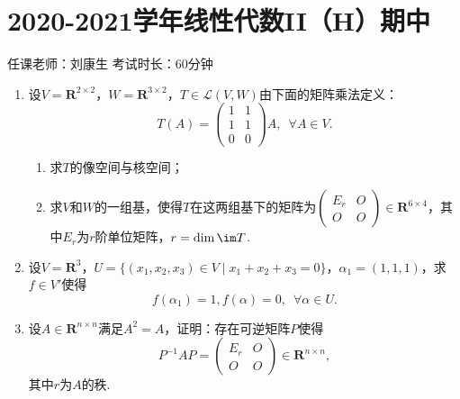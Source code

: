 \section{2020-2021学年线性代数II（H）期中}

\begin{center}
    任课老师：刘康生\hspace{4em} 考试时长：60分钟
\end{center}

\begin{enumerate}
    \item 设$V=\mathbf{R}^{2\times 2}$，$W=\mathbf{R}^{3\times 2}$，$T\in\mathcal{L}(V,W)$由下面的矩阵乘法定义：
	\[T(A)=\begin{pmatrix}
        1 & 1 \\ 1 & 1 \\ 0 & 0
    \end{pmatrix}A,\enspace \forall A\in V.\]
    \begin{enumerate}
        \item 求$T$的像空间与核空间；

        \item 求$V$和$W$的一组基，使得$T$在这两组基下的矩阵为$\begin{pmatrix}
            E_r & O \\ O & O
        \end{pmatrix}\in\mathbf{R}^{6\times 4}$，其中$E_r$为$r$阶单位矩阵，$r=\dim\im T$.
    \end{enumerate}
	\item 设$V=\mathbf{R}^3$，$U=\{(x_1,x_2,x_3)\in V\mid x_1+x_2+x_3=0\}$，$\alpha_1=(1,1,1)$，求$f\in V'$使得
	\[f(\alpha_1)=1,f(\alpha)=0,\enspace \forall\alpha\in U.\]
	\item 设$A\in\mathbf{R}^{n\times n}$满足$A^2=A$，证明：存在可逆矩阵$P$使得
	\[P^{-1}AP=\begin{pmatrix}
        E_r & O \\ O & O
    \end{pmatrix}\in\mathbf{R}^{n\times n},\]
    其中$r$为$A$的秩.
\end{enumerate}

\clearpage
